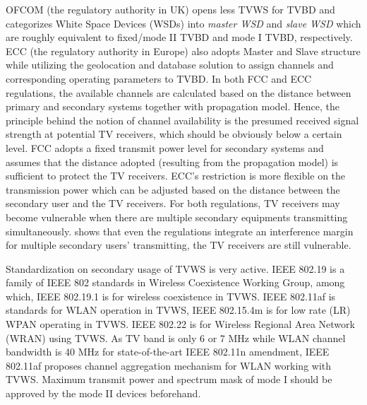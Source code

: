 OFCOM (the regulatory authority in UK) opens less TVWS for TVBD and categorizes White Space Devices (WSDs) into \textit{master WSD} and \textit{slave WSD} which are roughly equivalent to fixed/mode II TVBD and mode I TVBD, respectively.
ECC (the regulatory authority in Europe) also adopts Master and Slave structure while utilizing the geolocation and database solution to assign channels and corresponding operating parameters to TVBD.
In both FCC and ECC regulations, the available channels are calculated based on the distance between primary and secondary systems together with propagation model.
Hence, the principle behind the notion of channel availability is the presumed received signal strength at potential TV receivers, which should be obviously below a certain level.
FCC adopts a fixed transmit power level for secondary systems and assumes that the distance adopted (resulting from the propagation model) is sufficient to protect the TV receivers.
ECC's restriction is more flexible on the transmission power which can be adjusted based on the distance between the secondary user and the TV receivers. 
For both regulations, TV receivers may become vulnerable when there are multiple secondary equipments transmitting simultaneously.
\cite{Jaentti11} shows that even the regulations integrate an interference margin for multiple secondary users' transmitting, the TV receivers are still vulnerable.

%
%
Standardization on secondary usage of TVWS is very active. 
IEEE 802.19 is a family of IEEE 802 standards in Wireless Coexistence Working Group, among which, IEEE 802.19.1 is for wireless coexistence in TVWS. 
IEEE 802.11af is standards for WLAN operation in TVWS, IEEE 802.15.4m is for low rate (LR) WPAN operating in TVWS. 
IEEE 802.22 is for Wireless Regional Area Network (WRAN) using TVWS. 
As TV band is only 6 or 7 MHz while WLAN channel bandwidth is 40 MHz for state-of-the-art IEEE 802.11n amendment, IEEE 802.11af proposes channel aggregation mechanism for WLAN working with TVWS. 
Maximum transmit power and spectrum mask of mode I should be approved by the mode II devices beforehand.  


